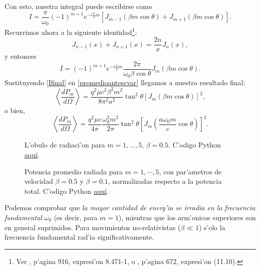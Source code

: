 Con esto, nuestra integral puede escribirse como
\begin{equation}
I=\frac{\pi}{\omega_0}(-1)^{m+1}e^{-i\frac{\pi}{2}m}\left[J_{m-1}\left(\beta
m\cos\theta\right)+J_{m+1}\left(\beta m\cos\theta\right)  \right]  .
\end{equation}
Recurrimos ahora a la siguiente identidad\footnote{Ver \cite{GR00}, p'agina 916, expresi'on 8.471-1, o \cite{AW01}, p'agina 672, expresi'on (11.10).}:
\begin{equation}
J_{n-1}(x)  +J_{n+1}(x)  =\frac{2n}{x}J_{n}\left(
x\right)  ,
\end{equation}
y entonces
\begin{equation}\label{Ifinal}
I=(-1)^{m+1}e^{-i\frac{\pi}{2}m}\frac{2\pi}{\omega_0\beta\cos\theta}J_{m}\left(  \beta m\cos\theta\right).
\end{equation}
Sustituyendo \eqref{Ifinal} en \eqref{promedioantescvar} llegamos a nuestro
resultado final:
\begin{equation}
\left\langle \frac{dP_{m}}{d\Omega}\right\rangle
=\frac{q^2\mu c^3\beta^2m^2}{8\pi^2 a^2}\tan^2\theta\left[  J_{m}\left(\beta
m\cos\theta\right)\right]^2,
\end{equation}
o bien,
\begin{equation}
\boxed{\left\langle \frac{dP_{m}}{d\Omega}\right\rangle
=\frac{q^2\mu c}{4\pi}\frac{\omega_0^2m^2}{2\pi}\tan^2\theta\left[ J_{m}\left(\frac{a\omega_0
m}{c}\cos\theta\right)  \right]^2.}
\end{equation}
\begin{figure}[ht]
\centerline{}
\caption{L'obulo de radiaci'on para $m=1,\dots,5$, $\beta=0.5$. C'odigo Python \href{https://github.com/gfrubi/electrodinamica/blob/master/figuras-editables/fig-mas.py}{aqu\'i}.}
\label{TER2}
\end{figure}
\begin{figure}[ht]
\centerline{}
 \caption{Potencia promedio radiada para $m=1,\cdots,5$, con par'ametros de velocidad $\beta=0.5$ y  $\beta=0.1$, normalizadas respecto a la potencia total.  C'odigo Python \href{https://github.com/gfrubi/electrodinamica/blob/master/figuras-editables/fig-mas-potencia-total-comparacion.py}{aqu\'i}.}
\label{TER3}
\end{figure}
Podemos comprobar que \textit{la mayor cantidad de energ'ia se irradia en la
frecuencia fundamental} $\omega_0$ (es decir, para $m=1$), mientras que los
arm'onicos superiores son en general suprimidos. Para movimientos
no-relativistas ($\beta\ll 1$) s'olo la frecuencia fundamental rad'ia
significativamente.

